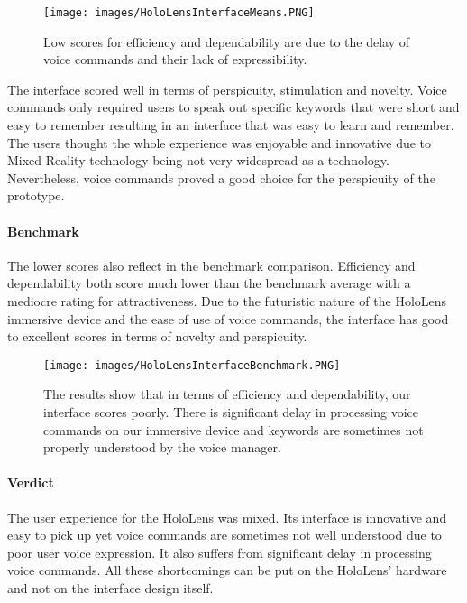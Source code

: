 \newpage
\begin{figure}[!htb]
	\texttt{[image: images/HoloLensInterfaceMeans.PNG]}
	\captionsetup{width=1.0\textwidth}
	\centering
	\caption{Low scores for efficiency and dependability are due to the delay of voice commands and their lack of expressibility.} 
\end{figure}

The interface scored well in terms of perspicuity, stimulation and novelty. Voice commands only required users to speak out specific keywords that were short and easy to remember resulting in an interface that was easy to learn and remember. The users thought the whole experience was enjoyable and innovative due to Mixed Reality technology being not very widespread as a technology. Nevertheless, voice commands proved a good choice for the perspicuity of the prototype.


\paragraph{Benchmark}
The lower scores also reflect in the benchmark comparison. Efficiency and dependability both score much lower than the benchmark average with a mediocre rating for attractiveness.
Due to the futuristic nature of the HoloLens immersive device and the ease of use of voice commands, the interface has good to excellent scores in terms of novelty and perspicuity.

\newpage
\begin{figure}[!htb]
	\texttt{[image: images/HoloLensInterfaceBenchmark.PNG]}
	\captionsetup{width=1.0\textwidth}
	\centering
	\caption{The results show that in terms of efficiency and dependability, our interface scores poorly. There is significant delay in processing voice commands on our immersive device and keywords are sometimes not properly understood by the voice manager.} 
\end{figure}


\paragraph{Verdict}
The user experience for the HoloLens was mixed. Its interface is innovative and easy to pick up yet voice commands are sometimes not well understood due to poor user voice expression. It also suffers from significant delay in processing voice commands. All these shortcomings can be put on the HoloLens' hardware and not on the interface design itself.

